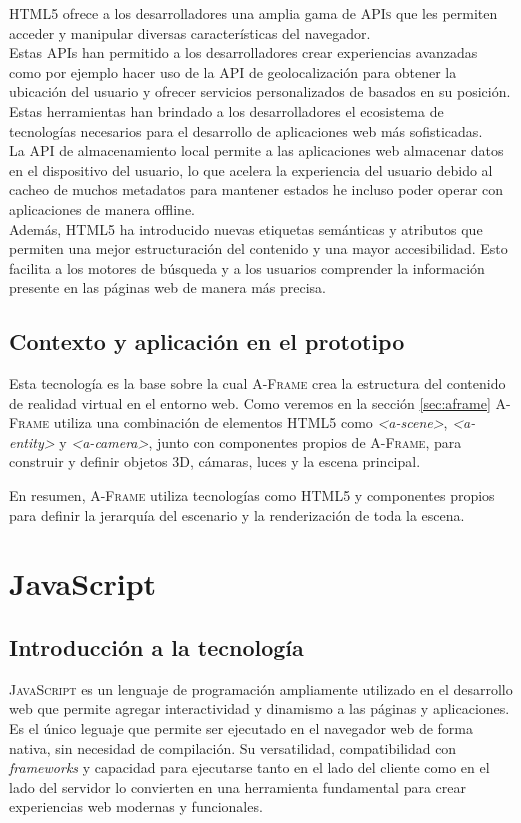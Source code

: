 \documentclass[a4paper, 11pt]{book}
\begin{document}
\textsc{HTML5} ofrece a los desarrolladores una amplia gama de \textsc{APIs} que les permiten acceder y manipular diversas características del navegador. \\
Estas APIs han permitido a los desarrolladores crear experiencias avanzadas como por ejemplo hacer uso de la API de geolocalización para obtener la ubicación del usuario y ofrecer servicios personalizados de basados en su posición. Estas herramientas han brindado a los desarrolladores el ecosistema de tecnologías necesarios para el desarrollo de aplicaciones web más sofisticadas.\\
La \textsc{API} de almacenamiento local permite a las aplicaciones web almacenar datos en el dispositivo del usuario, lo que acelera la experiencia del usuario debido al cacheo de muchos metadatos para mantener estados he incluso poder operar con aplicaciones de manera offline.\\
Además, \textsc{HTML5} ha introducido nuevas etiquetas semánticas y atributos que permiten una mejor estructuración del contenido y una mayor accesibilidad. Esto facilita a los motores de búsqueda y a los usuarios comprender la información presente en las páginas web de manera más precisa.
\subsection{Contexto y aplicación en el prototipo}
Esta tecnología es la base sobre la cual \textsc{A-Frame} crea la estructura del contenido de realidad virtual en el entorno web. 
Como veremos en la sección \ref{sec:aframe} \textsc{A-Frame} utiliza una combinación de elementos \textsc{HTML5} como \emph{\textless a-scene\textgreater}, \emph{\textless a-entity\textgreater} y \emph{\textless a-camera\textgreater}, junto con componentes propios de \textsc{A-Frame}, para construir y definir objetos \textsc{3D}, cámaras, luces y la escena principal.

En resumen, \textsc{A-Frame} utiliza tecnologías como \textsc{HTML5} y componentes propios para definir la jerarquía del escenario y la renderización de toda la escena.
\section{JavaScript}
\label{sec:javascript}
\subsection{Introducción a la tecnología}
\textsc{JavaScript} es un lenguaje de programación ampliamente utilizado en el desarrollo web que permite agregar interactividad y dinamismo a las páginas y aplicaciones. Es el único leguaje que permite ser ejecutado en el navegador web de forma nativa, sin necesidad de compilación. Su versatilidad, compatibilidad con \emph{frameworks} y capacidad para ejecutarse tanto en el lado del cliente como en el lado del servidor lo convierten en una herramienta fundamental para crear experiencias web modernas y funcionales.
\end{document}
